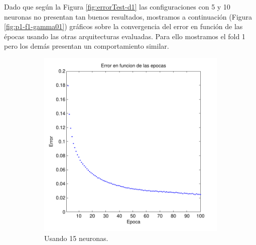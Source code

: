 \documentclass[informe.tex]{subfiles}
\begin{document}
      Dado que según la Figura \ref{fig:errorTest-d1} las configuraciones con 5 y 10 neuronas no presentan tan buenos resultados, mostramos a continuación (Figura \ref{fig:p1-f1-gamma01}) gráficos sobre la convergencia del error en función de las épocas usando las otras arquitecturas evaluadas. Para ello mostramos el fold 1 pero los demás presentan un comportamiento similar.
      
      \FloatBarrier
      \begin{figure}[H]
        \centering
        \begin{subfigure}[b]{0.32\textwidth}
                \includegraphics[width=\textwidth]{graficos/error_fold1_15_binary_100_01.pdf}
                \caption{Usando 15 neuronas.}
                \label{fig:d1-f1-01-n15}
        \end{subfigure}
        \begin{subfigure}[b]{0.32\textwidth}

\end{subfigure}
\end{figure}
\end{document}
